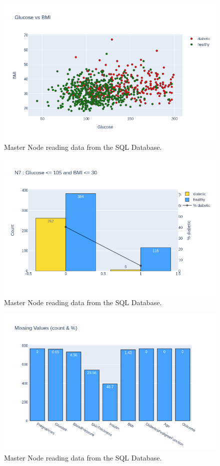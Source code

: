 \documentclass[12pt]{article}
\begin{document}
\begin{figure}[ht]
\centering
\includegraphics[width=1\textwidth]{newplot(28).png}
\caption{Master Node reading data from the SQL Database.}
\end{figure}

\begin{figure}[ht]
\centering
\includegraphics[width=1\textwidth]{newplot(29).png}
\caption{Master Node reading data from the SQL Database.}
\end{figure}

\begin{figure}[ht]
\centering
\includegraphics[width=1\textwidth]{newplot(2).png}
\caption{Master Node reading data from the SQL Database.}
\end{figure}
\end{document}
